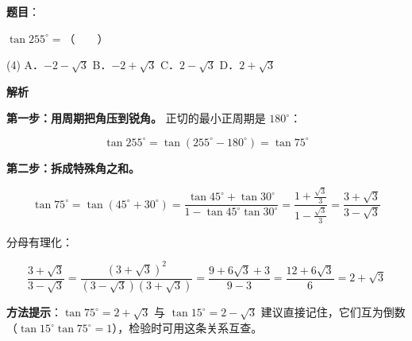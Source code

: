 \begin{answer}

\textbf{题目}：

$\tan255^\circ=$\mbox{（　　）}

\begin{gkopts}(4)
\task A．$-2-\sqrt3$
\task B．$-2+\sqrt3$
\task C．$2-\sqrt3$
\task D．$2+\sqrt3$
\end{gkopts}

\Needspace{0.6\textheight}

\textbf{解析}

\textbf{第一步：用周期把角压到锐角。} 正切的最小正周期是 $180^\circ$：

\nopagebreak[4]
\[\tan255^\circ=\tan(255^\circ-180^\circ)=\tan75^\circ\]

\textbf{第二步：拆成特殊角之和。}

\nopagebreak[4]
\[\tan75^\circ=\tan(45^\circ+30^\circ)=\frac{\tan45^\circ+\tan30^\circ}{1-\tan45^\circ\tan30^\circ}=\frac{1+\frac{\sqrt3}3}{1-\frac{\sqrt3}3}=\frac{3+\sqrt3}{3-\sqrt3}\]

分母有理化：

\nopagebreak[4]
\[\frac{3+\sqrt3}{3-\sqrt3}=\frac{(3+\sqrt3)^{2}}{(3-\sqrt3)(3+\sqrt3)}=\frac{9+6\sqrt3+3}{9-3}=\frac{12+6\sqrt3}6=2+\sqrt3\]

\begin{gktip}
\textbf{方法提示}：$\tan75^\circ=2+\sqrt3$ 与 $\tan15^\circ=2-\sqrt3$ 建议直接记住，它们互为倒数（$\tan15^\circ\tan75^\circ=1$），检验时可用这条关系互查。
\end{gktip}


\par\medskip

\end{answer}
